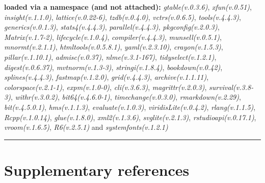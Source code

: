 \documentclass[
  bookmarksnumbered]{article}
\begin{document}
\textbf{loaded via a namespace (and not attached):}
\emph{gtable(v.0.3.6)}, \emph{xfun(v.0.51)}, \emph{insight(v.1.1.0)}, \emph{lattice(v.0.22-6)}, \emph{tzdb(v.0.4.0)}, \emph{vctrs(v.0.6.5)}, \emph{tools(v.4.4.3)}, \emph{generics(v.0.1.3)}, \emph{stats4(v.4.4.3)}, \emph{parallel(v.4.4.3)}, \emph{pkgconfig(v.2.0.3)}, \emph{Matrix(v.1.7-2)}, \emph{lifecycle(v.1.0.4)}, \emph{compiler(v.4.4.3)}, \emph{munsell(v.0.5.1)}, \emph{mnormt(v.2.1.1)}, \emph{htmltools(v.0.5.8.1)}, \emph{yaml(v.2.3.10)}, \emph{crayon(v.1.5.3)}, \emph{pillar(v.1.10.1)}, \emph{admisc(v.0.37)}, \emph{nlme(v.3.1-167)}, \emph{tidyselect(v.1.2.1)}, \emph{digest(v.0.6.37)}, \emph{mvtnorm(v.1.3-3)}, \emph{stringi(v.1.8.4)}, \emph{bookdown(v.0.42)}, \emph{splines(v.4.4.3)}, \emph{fastmap(v.1.2.0)}, \emph{grid(v.4.4.3)}, \emph{archive(v.1.1.11)}, \emph{colorspace(v.2.1-1)}, \emph{expm(v.1.0-0)}, \emph{cli(v.3.6.3)}, \emph{magrittr(v.2.0.3)}, \emph{survival(v.3.8-3)}, \emph{withr(v.3.0.2)}, \emph{bit64(v.4.6.0-1)}, \emph{timechange(v.0.3.0)}, \emph{rmarkdown(v.2.29)}, \emph{bit(v.4.5.0.1)}, \emph{hms(v.1.1.3)}, \emph{evaluate(v.1.0.3)}, \emph{viridisLite(v.0.4.2)}, \emph{rlang(v.1.1.5)}, \emph{Rcpp(v.1.0.14)}, \emph{glue(v.1.8.0)}, \emph{xml2(v.1.3.6)}, \emph{svglite(v.2.1.3)}, \emph{rstudioapi(v.0.17.1)}, \emph{vroom(v.1.6.5)}, \emph{R6(v.2.5.1)} and \emph{systemfonts(v.1.2.1)}

\begin{center}\rule{0.5\linewidth}{0.5pt}\end{center}

\section{Supplementary references}\label{refs}

\begin{multicols}{2}
\AtNextBibliography{\footnotesize}
\printbibliography[heading=none]
\normalsize
\end{multicols}

\def\printbibliography{}

\printbibliography
\end{document}
